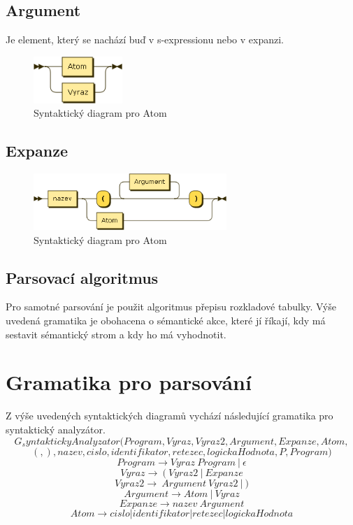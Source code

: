 \documentclass[a4paper,11pt]{article}
\begin{document}
\newpage

\subsection{Argument}
Je element, který se nachází buď v s-expressionu nebo v expanzi.
\begin{figure}[!h]
    \centering
    \includegraphics[width=0.3\textwidth]{obrazky/Argument.png}
    \caption{Syntaktický diagram pro Atom}
    \label{fig:Syntaktický diagram pro Atom}
\end{figure}

\subsection{Expanze}
\begin{figure}[!h]
    \centering
    \includegraphics[width=0.65\textwidth]{obrazky/Expanze.png}
    \caption{Syntaktický diagram pro Atom}
    \label{fig:Syntaktický diagram pro Atom}
\end{figure}

\subsection{Parsovací algoritmus}
Pro samotné parsování je použit algoritmus přepisu rozkladové tabulky. Výše uvedená gramatika je obohacena o sémantické akce, které jí říkají, kdy má sestavit sémantický strom a kdy ho má vyhodnotit.

\section{Gramatika pro parsování}
Z výše uvedených syntaktických diagramů vychází následující gramatika pro syntaktický analyzátor.
$$G_syntaktickyAnalyzator({Program, Vyraz, Vyraz2, Argument, Expanze, Atom},$$
$${(, ), nazev, cislo, identifikator, retezec, logickaHodnota},
P,
Program)$$
$$Program \rightarrow Vyraz\:Program\:|\:\epsilon$$
$$Vyraz \rightarrow\:(\:Vyraz2\:|\:Expanze$$
$$Vyraz2 \rightarrow\:Argument\:Vyraz2\:|\:)$$
$$Argument \rightarrow Atom\:|\:Vyraz$$
$$Expanze \rightarrow nazev\:Argument$$
$$Atom \rightarrow cislo | identifikator | retezec | logickaHodnota$$
\end{document}
